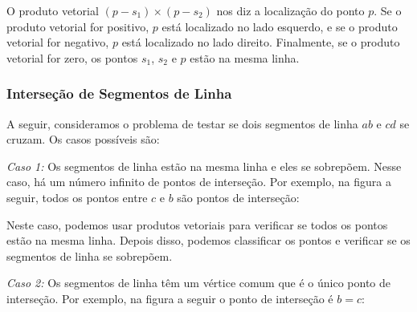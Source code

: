 O produto vetorial $(p-s_1) \times (p-s_2)$
nos diz a localização do ponto $p$.
Se o produto vetorial for positivo,
$p$ está localizado no lado esquerdo,
e se o produto vetorial for negativo,
$p$ está localizado no lado direito.
Finalmente, se o produto vetorial for zero,
os pontos $s_1$, $s_2$ e $p$ estão na mesma linha.

\subsubsection{Interseção de Segmentos de Linha}


A seguir, consideramos o problema de testar
se dois segmentos de linha
$ab$ e $cd$ se cruzam. Os casos possíveis são:

\textit{Caso 1:}
Os segmentos de linha estão na mesma linha
e eles se sobrepõem.
Nesse caso, há um número infinito de
pontos de interseção.
Por exemplo, na figura a seguir,
todos os pontos entre $c$ e $b$ são
pontos de interseção:
\begin{center}
\end{center}

Neste caso, podemos usar produtos vetoriais para
verificar se todos os pontos estão na mesma linha.
Depois disso, podemos classificar os pontos e verificar
se os segmentos de linha se sobrepõem.

\textit{Caso 2:}
Os segmentos de linha têm um vértice comum
que é o único ponto de interseção.
Por exemplo, na figura a seguir o
ponto de interseção é $b=c$:

\begin{center}
\end{center}

